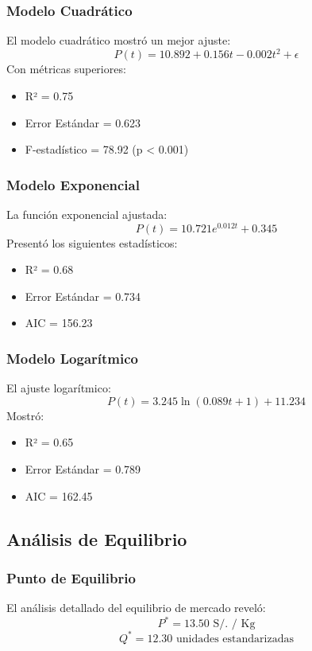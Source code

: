 \documentclass[12pt, a4paper]{article}
\begin{document}
\subsubsection{Modelo Cuadrático}
El modelo cuadrático mostró un mejor ajuste:
\[ P(t) = 10.892 + 0.156t - 0.002t^2 + \epsilon \]
Con métricas superiores:
\begin{itemize}
    \item R² = 0.75
    \item Error Estándar = 0.623
    \item F-estadístico = 78.92 (p < 0.001)
\end{itemize}

\subsubsection{Modelo Exponencial}
La función exponencial ajustada:
\[ P(t) = 10.721e^{0.012t} + 0.345 \]
Presentó los siguientes estadísticos:
\begin{itemize}
    \item R² = 0.68
    \item Error Estándar = 0.734
    \item AIC = 156.23
\end{itemize}

\subsubsection{Modelo Logarítmico}
El ajuste logarítmico:
\[ P(t) = 3.245\ln(0.089t + 1) + 11.234 \]
Mostró:
\begin{itemize}
    \item R² = 0.65
    \item Error Estándar = 0.789
    \item AIC = 162.45
\end{itemize}

\subsection{Análisis de Equilibrio}
\subsubsection{Punto de Equilibrio}
El análisis detallado del equilibrio de mercado reveló:
\begin{equation}
    P^* = 13.50 \text{ S/. / Kg}
\end{equation}
\begin{equation}
    Q^* = 12.30 \text{ unidades estandarizadas}
\end{equation}
\end{document}
